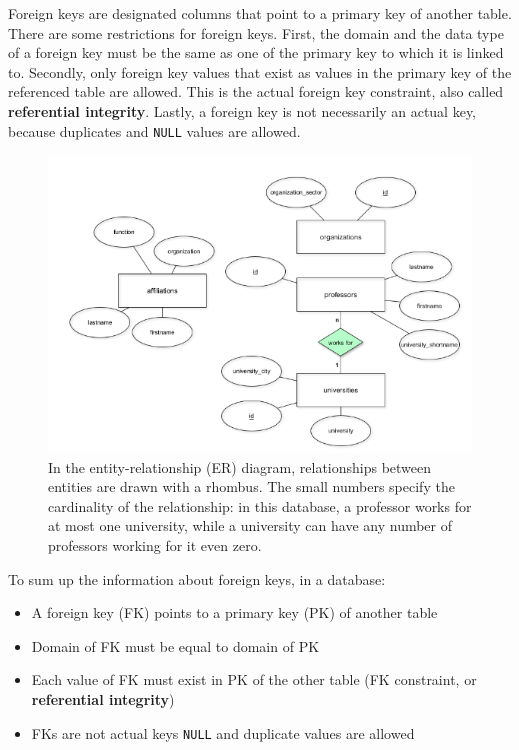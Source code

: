 \documentclass[11pt]{article}
\begin{document}
    Foreign keys are designated columns that point to a primary key of another table.
    There are some restrictions for foreign keys.
    First, the domain and the data type of a foreign key must be the same as one of the primary key to which it is linked to.
    Secondly, only foreign key values that exist as values in the primary key of the referenced table are allowed.
    This is the actual foreign key constraint, also called \textbf{referential integrity}.
    Lastly, a foreign key is not necessarily an actual key, because duplicates and \texttt{NULL} values are allowed.

    \begin{figure}[hbt!]
        \centering
        \includegraphics[width=1\linewidth,trim=1 1 1 1,clip]{img/fk.png}
        \caption{In the entity-relationship (ER) diagram, relationships between entities are drawn with a rhombus.
        The small numbers specify the cardinality of the relationship: in this database, a professor works for at most one university, while a university can have any number of professors working for it \textemdash even zero.}
        \label{fig:fk}
    \end{figure}

    To sum up the information about foreign keys, in a database:

    \begin{itemize}
        \item A foreign key (FK) points to a primary key (PK) of another table
        \item Domain of FK must be equal to domain of PK
        \item Each value of FK must exist in PK of the other table (FK constraint, or \textbf{referential integrity})
        \item FKs are not actual keys \textemdash \texttt{NULL} and duplicate values are allowed
    \end{itemize}
\end{document}
